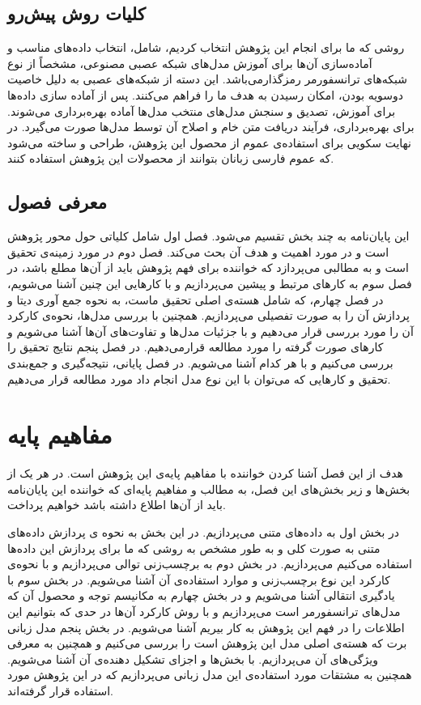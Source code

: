 \section{کلیات روش پیش‌رو}
\hspace{30pt}
 روشی که ما برای انجام این پژوهش انتخاب کردیم، شامل، انتخاب داده‌های مناسب و آماده‌سازی آن‌ها برای آموزش مدل‌های شبکه عصبی مصنوعی، مشخصاً از نوع شبکه‌های ترانسفورمر رمزگذارمی‌باشد. این دسته از شبکه‌های عصبی به دلیل خاصیت دوسویه بودن، امکان رسیدن به هدف ما را فراهم می‌کنند. پس از آماده سازی داده‌ها برای آموزش، تصدیق و سنجش مدل‌های منتخب مدل‌ها آماده بهره‌برداری می‌شوند. برای بهره‌برداری، فرآیند دریافت متن خام و اصلاح آن توسط مدل‌ها صورت می‌گیرد. در نهایت سکویی برای استفاده‌ی عموم از محصول این پژوهش، طراحی و ساخته می‌شود که عموم فارسی زبانان بتوانند از محصولات این پژوهش استفاده کنند.

\section{معرفی فصول}
\hspace{30pt}
این پایان‌نامه به چند بخش تقسیم می‌شود. فصل اول شامل کلیاتی حول‌ محور پژوهش است و در مورد اهمیت و هدف آن بحث می‌کند. فصل دوم در مورد زمینه‌ی تحقیق است و به مطالبی می‌پردازد که خواننده برای فهم پژوهش باید از آن‌ها مطلع باشد، در فصل سوم به کارهای مرتبط و پیشین می‌پردازیم و با کارهایی این چنین آشنا می‌شویم، در فصل چهارم، که شامل هسته‌ی اصلی تحقیق ماست، به نحوه جمع آوری دیتا و پردازش آن را به صورت تفصیلی می‌پردازیم. همچنین با بررسی مدل‌ها، نحوه‌ی کارکرد آن را مورد بررسی قرار می‌دهیم و با جزئيات مدل‌ها و تفاوت‌های آن‌ها آشنا می‌شویم و کارهای صورت گرفته را مورد مطالعه قرار‌می‌دهیم. در فصل پنجم نتایج تحقیق را بررسی می‌کنیم و با هر کدام آشنا می‌شویم. در فصل پایانی، نتیجه‌گیری و جمع‌بندی تحقیق و کارهایی که می‌توان با این نوع مدل انجام داد مورد مطالعه قرار می‌دهیم.

\chapter{مفاهیم پایه}
\hspace{30pt}
هدف از این فصل آشنا کردن خواننده با مفاهیم پایه‌ی این پژوهش است. در هر یک از بخش‌ها و زیر بخش‌های این فصل، به مطالب و مفاهیم پایه‌ای که خواننده این پایان‌نامه باید از آن‌ها اطلاع داشته باشد خواهیم پرداخت.

در بخش اول به داده‌های متنی می‌پردازیم. در این بخش به نحوه ی پردازش داده‌‌های متنی به صورت کلی و به طور مشخص به روشی که ما برای پردازش این داده‌ها استفاده می‌کنیم می‌پردازیم. در بخش دوم به برچسب‌زنی توالی می‌پردازیم و با نحوه‌ی کارکرد این نوع برچسب‌زنی و موارد استفاده‌ی آن آشنا می‌شویم. در بخش سوم با یادگیری انتقالی آشنا می‌شویم و در بخش چهارم به مکانیسم توجه و محصول آن که مدل‌های ترانسفورمر است می‌پردازیم و با روش کارکرد آن‌ها در حدی که بتوانیم این اطلاعات را در فهم این پژوهش به کار بیریم آشنا مى‌شویم. در بخش پنجم مدل زبانی برت که هسته‌ی اصلی مدل این پژوهش است را بررسی می‌کنیم و همچنین به معرفی ویژگی‌های آن می‌پردازیم. با بخش‌ها و اجزای تشکیل دهنده‌ی آن آشنا می‌شویم. همچنین به مشتقات مورد استفاده‌ی این مدل زبانی می‌پردازیم که در این پژوهش مورد استفاده قرار گرفته‌اند.

